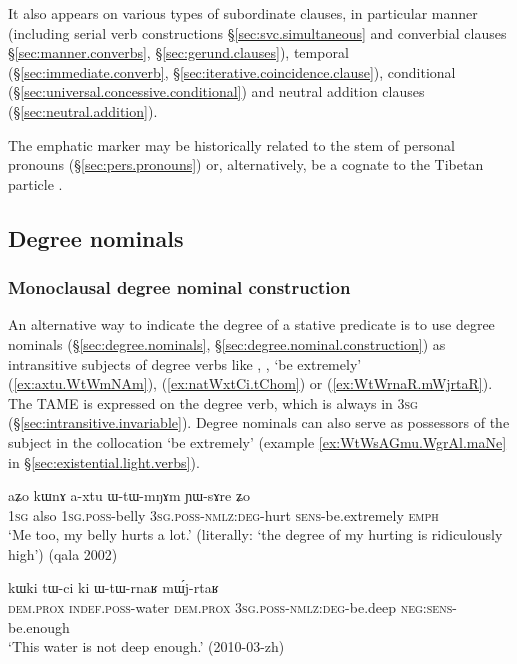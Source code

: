 It also appears on various types of subordinate clauses, in particular manner (including serial verb constructions §\ref{sec:svc.simultaneous} and converbial clauses §\ref{sec:manner.converbs}, §\ref{sec:gerund.clauses}), temporal (§\ref{sec:immediate.converb}, §\ref{sec:iterative.coincidence.clause}),  conditional (§\ref{sec:universal.concessive.conditional}) and neutral addition clauses  (§\ref{sec:neutral.addition}).

The emphatic marker may be historically related to the  stem of personal pronouns (§\ref{sec:pers.pronouns}) or, alternatively, be a cognate to the Tibetan particle .

\subsection{Degree nominals} \label{sec:degree.nominal.subject}

\subsubsection{Monoclausal degree nominal construction} \label{sec:degree.monoclausal}
An alternative way to indicate the degree of a stative predicate is to use degree nominals (§\ref{sec:degree.nominals}, §\ref{sec:degree.nominal.construction}) as intransitive subjects of degree verbs like , , `be extremely' (\ref{ex:axtu.WtWmNAm}),  (\ref{ex:natWxtCi.tChom}) or  (\ref{ex:WtWrnaR.mWjrtaR}). The TAME is expressed on the degree verb, which is always in \textsc{3sg} (§\ref{sec:intransitive.invariable}). Degree nominals can also serve as possessors of the subject   in the collocation  `be extremely' (example \ref{ex:WtWsAGmu.WgrAl.maNe} in §\ref{sec:existential.light.verbs}). 

\begin{exe}
\ex \label{ex:axtu.WtWmNAm}
\gll aʑo kɯnɤ a-xtu ɯ-tɯ-mŋɤm ɲɯ-sɤre ʑo \\
\textsc{1sg} also \textsc{1sg}.\textsc{poss}-belly \textsc{3sg}.\textsc{poss}-\textsc{nmlz}:\textsc{deg}-hurt \textsc{sens}-be.extremely \textsc{emph} \\
\glt `Me too, my belly hurts a lot.' (literally: `the degree of my hurting is ridiculously high') (qala 2002)
\end{exe}

\begin{exe}
\ex \label{ex:WtWrnaR.mWjrtaR}
\gll kɯki tɯ-ci ki ɯ-tɯ-rnaʁ mɯ́j-rtaʁ \\
\textsc{dem}.\textsc{prox} \textsc{indef}.\textsc{poss}-water \textsc{dem}.\textsc{prox} \textsc{3sg}.\textsc{poss}-\textsc{nmlz}:\textsc{deg}-be.deep \textsc{neg}:\textsc{sens}-be.enough \\
\glt `This water is not deep enough.' (2010-03-zh)
\end{exe}

